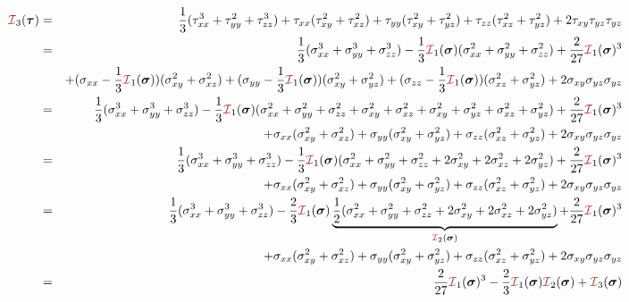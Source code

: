 \begin{eqnarray}
{\III}_3(\bm\tau) 
&=& 
\frac{1}{3}(\tau_{xx}^3 + \tau_{yy}^2 + \tau_{zz}^3) 
+\tau_{xx}(\tau_{xy}^2 + \tau_{xz}^2 ) 
+\tau_{yy}(\tau_{xy}^2 + \tau_{yz}^2 ) 
+\tau_{zz}(\tau_{xz}^2 + \tau_{yz}^2 ) 
+2\tau_{xy}\tau_{yz}\tau_{yz} \nn\\
&=& 
\frac{1}{3}(\sigma_{xx}^3 + \sigma_{yy}^3 + \sigma_{zz}^3)
-\frac13{\III}_1(\bm\sigma) (\sigma_{xx}^2+\sigma_{yy}^2+\sigma_{zz}^2)
+\frac{2}{27} {\III}_1(\bm\sigma)^3 \nn\\
&& 
+(\sigma_{xx}-\frac13 {\III}_1(\bm\sigma))(\sigma_{xy}^2 + \sigma_{xz}^2 ) 
+(\sigma_{yy}-\frac13 {\III}_1(\bm\sigma))(\sigma_{xy}^2 + \sigma_{yz}^2 ) 
+(\sigma_{zz}-\frac13 {\III}_1(\bm\sigma))(\sigma_{xz}^2 + \sigma_{yz}^2 ) 
+2\sigma_{xy}\sigma_{yz}\sigma_{yz} \nn\\
&=& 
\frac{1}{3}(\sigma_{xx}^3 + \sigma_{yy}^3 + \sigma_{zz}^3)
-\frac13{\III}_1(\bm\sigma) (\sigma_{xx}^2+\sigma_{yy}^2+\sigma_{zz}^2
+ \sigma_{xy}^2 + \sigma_{xz}^2
+\sigma_{xy}^2 + \sigma_{yz}^2
+\sigma_{xz}^2 + \sigma_{yz}^2 
)
+\frac{2}{27} {\III}_1(\bm\sigma)^3 \nn\\
&& 
+\sigma_{xx}(\sigma_{xy}^2 + \sigma_{xz}^2 ) 
+\sigma_{yy}(\sigma_{xy}^2 + \sigma_{yz}^2 ) 
+\sigma_{zz}(\sigma_{xz}^2 + \sigma_{yz}^2 ) 
+2\sigma_{xy}\sigma_{yz}\sigma_{yz} \nn\\
&=& 
\frac{1}{3}(\sigma_{xx}^3 + \sigma_{yy}^3 + \sigma_{zz}^3)
-\frac13{\III}_1(\bm\sigma) (\sigma_{xx}^2+\sigma_{yy}^2+\sigma_{zz}^2
+ 2\sigma_{xy}^2 + 2\sigma_{xz}^2 + 2\sigma_{yz}^2  )
+\frac{2}{27} {\III}_1(\bm\sigma)^3 \nn\\
&& 
+\sigma_{xx}(\sigma_{xy}^2 + \sigma_{xz}^2 ) 
+\sigma_{yy}(\sigma_{xy}^2 + \sigma_{yz}^2 ) 
+\sigma_{zz}(\sigma_{xz}^2 + \sigma_{yz}^2 ) 
+2\sigma_{xy}\sigma_{yz}\sigma_{yz} \nn\\
&=& 
\frac{1}{3}(\sigma_{xx}^3 + \sigma_{yy}^3 + \sigma_{zz}^3)
-\frac23{\III}_1(\bm\sigma)
\underbrace{\frac12  (\sigma_{xx}^2+\sigma_{yy}^2+\sigma_{zz}^2
+ 2\sigma_{xy}^2 + 2\sigma_{xz}^2 + 2\sigma_{yz}^2  )}_{{\III}_2(\bm\sigma)}
+\frac{2}{27} {\III}_1(\bm\sigma)^3 \nn\\
&& 
+\sigma_{xx}(\sigma_{xy}^2 + \sigma_{xz}^2 ) 
+\sigma_{yy}(\sigma_{xy}^2 + \sigma_{yz}^2 ) 
+\sigma_{zz}(\sigma_{xz}^2 + \sigma_{yz}^2 ) 
+2\sigma_{xy}\sigma_{yz}\sigma_{yz} \nn\\
&=& \frac{2}{27}  {\III}_1(\bm\sigma)^3 - \frac23{\III}_1(\bm\sigma) {\III}_2(\bm\sigma)
+{\III}_3(\bm\sigma) \nn
\end{eqnarray}

